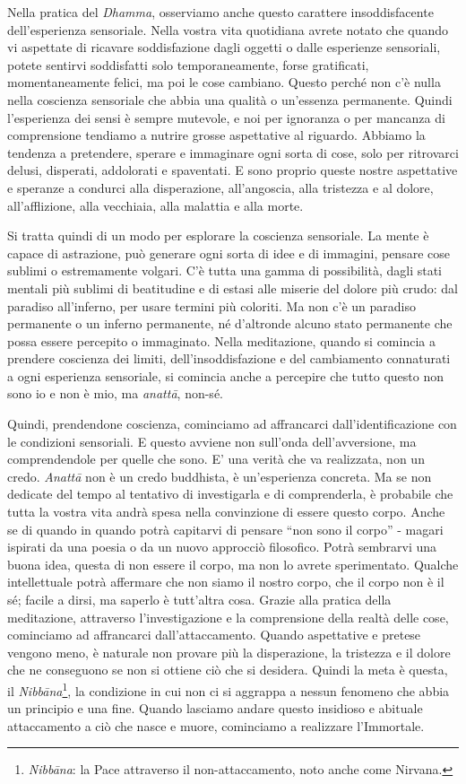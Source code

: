 Nella pratica del \textit{Dhamma}, osserviamo anche questo carattere
insoddisfacente dell'esperienza sensoriale. Nella vostra vita quotidiana
avrete notato che quando vi aspettate di ricavare soddisfazione dagli
oggetti o dalle esperienze sensoriali, potete sentirvi soddisfatti solo
temporaneamente, forse gratificati, momentaneamente felici, ma poi le
cose cambiano. Questo perché non c'è nulla nella coscienza sensoriale
che abbia una qualità o un'essenza permanente. Quindi l'esperienza dei
sensi è sempre mutevole, e noi per ignoranza o per mancanza di
comprensione tendiamo a nutrire grosse aspettative al riguardo. Abbiamo
la tendenza a pretendere, sperare e immaginare ogni sorta di cose, solo
per ritrovarci delusi, disperati, addolorati e spaventati. E sono
proprio queste nostre aspettative e speranze a condurci alla
disperazione, all'angoscia, alla tristezza e al dolore, all'afflizione,
alla vecchiaia, alla malattia e alla morte.

Si tratta quindi di un modo per esplorare la coscienza sensoriale. La
mente è capace di astrazione, può generare ogni sorta di idee e di
immagini, pensare cose sublimi o estremamente volgari. C'è tutta una
gamma di possibilità, dagli stati mentali più sublimi di beatitudine e
di estasi alle miserie del dolore più crudo: dal paradiso all'inferno,
per usare termini più coloriti. Ma non c'è un paradiso permanente o un
inferno permanente, né d'altronde alcuno stato permanente che possa
essere percepito o immaginato. Nella meditazione, quando si comincia a
prendere coscienza dei limiti, dell'insoddisfazione e del cambiamento
connaturati a ogni esperienza sensoriale, si comincia anche a percepire
che tutto questo non sono io e non è mio, ma \textit{anattā}, non-sé.

Quindi, prendendone coscienza, cominciamo ad affrancarci
dall'identificazione con le condizioni sensoriali. E questo avviene non
sull'onda dell'avversione, ma comprendendole per quelle che sono. E' una
verità che va realizzata, non un credo. \textit{Anattā} non è un credo buddhista,
è un'esperienza concreta. Ma se non dedicate del tempo al tentativo di
investigarla e di comprenderla, è probabile che tutta la vostra vita
andrà spesa nella convinzione di essere questo corpo. Anche se di quando
in quando potrà capitarvi di pensare ``non sono il corpo'' - magari
ispirati da una poesia o da un nuovo approcciò filosofico. Potrà
sembrarvi una buona idea, questa di non essere il corpo, ma non lo
avrete sperimentato. Qualche intellettuale potrà affermare che non siamo
il nostro corpo, che il corpo non è il sé; facile a dirsi, ma saperlo è
tutt'altra cosa. Grazie alla pratica della meditazione, attraverso
l'investigazione e la comprensione della realtà delle cose, cominciamo
ad affrancarci dall'attaccamento. Quando aspettative e pretese vengono
meno, è naturale non provare più la disperazione, la tristezza e il
dolore che ne conseguono se non si ottiene ciò che si desidera. Quindi
la meta è questa, il \textit{Nibbāna}\footnote{\textit{Nibbāna}: la Pace attraverso il non-attaccamento, noto
anche come Nirvana.}, la condizione in cui non ci si
aggrappa a nessun fenomeno che abbia un principio e una fine. Quando
lasciamo andare questo insidioso e abituale attaccamento a ciò che nasce
e muore, cominciamo a realizzare l'Immortale.

